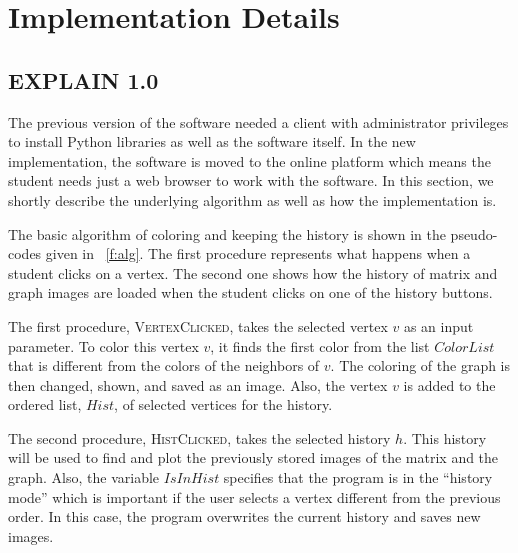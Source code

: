 \documentclass[12pt, twoside,a4paper,toc=bibliography]{scrbook}
\begin{document}
\section{Implementation Details}
\label{s.impl.explain}
\subsection{EXPLAIN 1.0}
\label{s.impl.explain1}
The previous version of the software \cite{Lulfesmann2010} needed a client with administrator privileges to install Python libraries as well as the software itself. In the new implementation, the software is moved to the online platform which means the student needs just a web browser to work with the software. In this section, we shortly describe the underlying algorithm as well as how the implementation is.

The basic algorithm of coloring and keeping the history is shown in the pseudo-codes given in \figurename~\ref{f:alg}. The first procedure represents what happens when a student clicks on a vertex. The second one shows how the history of matrix and graph images are loaded when the student clicks on one of the history buttons.

The first procedure, \textsc{VertexClicked}, takes the selected vertex $v$ as an input parameter. To color this vertex $v$, it finds the first color from the list $ColorList$ that is different from the colors of the neighbors of $v$. The coloring of the graph is then changed, shown, and saved as an image. 
Also, the vertex $v$ is added to the ordered list, $Hist$, of selected vertices for the history.

The second procedure, \textsc{HistClicked}, takes the selected history $h$. This history will be used to find and plot the previously stored images of the matrix and the graph. Also, the variable $IsInHist$ specifies that the program is in the ``history mode'' which is important if the user selects a vertex different from the previous order. In this case, the program overwrites the current history and saves new images.
\end{document}
